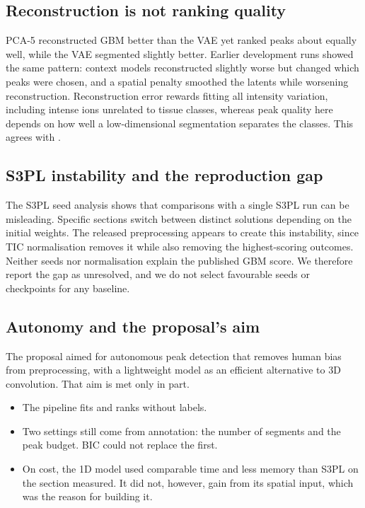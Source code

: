 \subsection{Reconstruction is not ranking quality}
PCA-5 reconstructed GBM better than the VAE yet ranked peaks about equally
well, while the VAE segmented slightly better. Earlier development runs showed
the same pattern: context models reconstructed slightly worse but changed which
peaks were chosen, and a spatial penalty smoothed the latents while worsening
reconstruction. Reconstruction error rewards fitting all intensity variation,
including intense ions unrelated to tissue classes, whereas peak quality here
depends on how well a low-dimensional segmentation separates the classes. This
agrees with \citet{mazarura2025autoencoder}.

\subsection{S3PL instability and the reproduction gap}
The S3PL seed analysis shows that comparisons with a single S3PL run can be
misleading. Specific sections switch between distinct solutions depending on
the initial weights. The released preprocessing appears to create this
instability, since TIC normalisation removes it while also removing the
highest-scoring outcomes. Neither seeds nor normalisation explain the
published GBM score. We therefore report the gap as unresolved, and we do not
select favourable seeds or checkpoints for any baseline.

\subsection{Autonomy and the proposal's aim}
The proposal aimed for autonomous peak detection that removes human bias from
preprocessing, with a lightweight model as an efficient alternative to 3D
convolution. That aim is met only in part.
\begin{itemize}
  \item The pipeline fits and ranks without labels.
  \item Two settings still come from annotation: the number of segments and the
        peak budget. BIC could not replace the first.
  \item On cost, the 1D model used comparable time and less memory than S3PL
        on the section measured. It did not, however, gain from its spatial
        input, which was the reason for building it.
\end{itemize}

